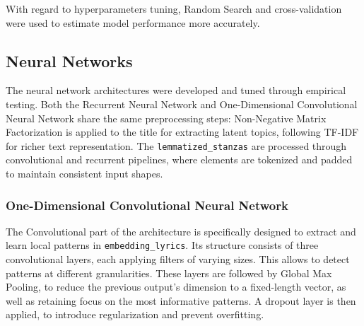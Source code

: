 With regard to hyperparameters tuning, Random Search and cross-validation were used to
estimate model performance more accurately.



\subsection*{Neural Networks}

The neural network architectures were developed and tuned through empirical
testing. Both the Recurrent
Neural Network and One-Dimensional Convolutional Neural Network share the same
preprocessing steps: Non-Negative Matrix Factorization is applied to the title
for extracting latent topics, following TF-IDF for richer text representation.
The \texttt{lemmatized\_stanzas} are processed through convolutional and
recurrent pipelines, where elements are tokenized and padded to maintain
consistent input shapes.

\subsubsection*{One-Dimensional Convolutional Neural Network}
The Convolutional part of the architecture is specifically designed to extract and learn
local patterns in \texttt{embedding\_lyrics}.
Its structure consists of three convolutional layers, each applying filters of
varying sizes. This allows to detect patterns at different granularities.
These layers are followed by Global Max Pooling, to reduce the previous output's
dimension to a fixed-length vector, as well as retaining focus on the most
informative patterns.
A dropout layer is then applied, to introduce regularization and prevent
overfitting.

